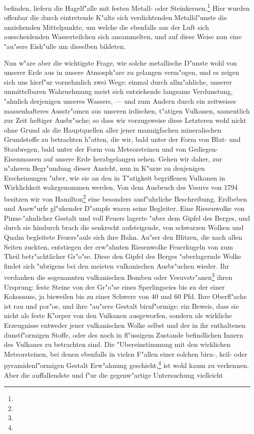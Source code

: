 \documentclass[a4paper, 8pt, oneside, polutonikogreek, german]{article}
\begin{document}
befinden, liefern die Hagelf"alle mit festen Metall- oder Steinkernen.\footnote{} Hier wurden offenbar die durch eintretende K"alte sich verdichtenden Metalld"unste die anziehenden Mittelpunkte, um welche die ebenfalls aus der Luft sich ausscheidenden Wasserteilchen sich ansammelten, und auf diese Weise nun eine "au"sere Eish"ulle um dieselben bildeten.

Nun w"are aber die wichtigste Frage, wie solche metallische D"unste wohl von unserer Erde aus in unsere Atmosph"are zu gelangen verm"ogen, und es zeigen sich uns hierf"ur vornehmlich zwei Wege: einmal durch allm"ahliche, unserer unmittelbaren Wahrnehmung meist sich entziehende langsame Verdunstung, "ahnlich derjenigen unseres Wassers, --- und zum Andern durch ein zeitweises massenhafteres Ausstr"omen aus unseren irdischen, t"atigen Vulkanen, namentlich zur Zeit heftiger Ausbr"uche; so dass wir vorzugsweise diese Letzteren wohl nicht ohne Grund als die Hauptquellen aller jener mannigfachen mineralischen Grundstoffe zu betrachten h"atten, die wir, bald unter der Form von Blut- und Staubregen, bald unter der Form von Meteorsteinen und von Gediegen-Eisenmassen auf unsere Erde herabgelangen sehen. Gehen wir daher, zur n"aheren Begr"undung dieser Ansicht, nun in K"urze zu denjenigen Erscheinungen "uber, wie sie an den in T"atigkeit begriffenen Vulkanen in Wirklichkeit wahrgenommen werden. Von dem Ausbruch des Vesuvs von 1794 besitzen wir von Hamilton\footnote{} eine besonders ausf"uhrliche Beschreibung. Erdbeben und Ausw"urfe gl"uhender D"ampfe waren seine Begleiter. Eine Riesenwolke von Pinus-"ahnlicher Gestalt und voll Feuers lagerte "uber dem Gipfel des Berges, und durch sie hindurch brach die senkrecht aufsteigende, von schwarzen Wolken und Qualm begleitete Feuers"aule sich ihre Bahn. Au"ser den Blitzen, die nach allen Seiten zuckten, entstiegen der erw"ahnten Riesenwolke Feuerkugeln von zum Theil betr"achtlicher Gr"o"se. Diese den Gipfel des Berges "uberlagernde Wolke findet sich "ubrigens bei den meisten vulkanischen Ausbr"uchen wieder. Ihr verdanken die sogenannten vulkanischen Bomben oder Vesuvstr"anen\footnote{} ihren Ursprung: feste Steine von der Gr"o"se eines Sperlingseies bis zu der einer Kokosnuss, ja bisweilen bis zu einer Schwere von 40 und 60 Pfd. Ihre Oberfl"ache ist rau und por"os, und ihre "au"sere Gestalt birnf"ormige: ein Beweis, dass sie nicht als feste K"orper von den Vulkanen ausgeworfen, sondern als wirkliche Erzeugnisse entweder jener vulkanischen Wolke selbst und der in ihr enthaltenen dunstf"ormigen Stoffe, oder des noch in fl"ussigem Zustande befindlichen Innern des Vulkanes zu betrachten sind. Die "Ubereinstimmung mit den wirklichen Meteorsteinen, bei denen ebenfalls in vielen F"allen einer solchen birn-, keil- oder pyramidenf"ormigen Gestalt Erw"ahnung geschieht,\footnote{} ist wohl kaum zu verkennen. Aber die auffallendste und f"ur die gegenw"artige Untersuchung vielleicht 
\end{document}
